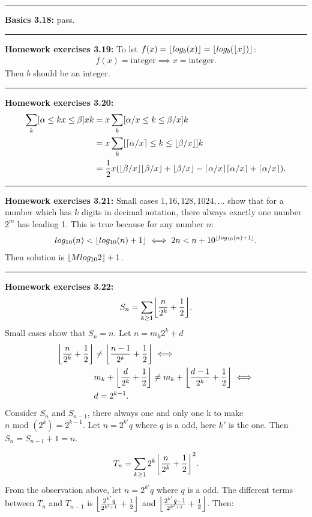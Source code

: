 \documentclass{article}
\DeclarePairedDelimiter\ceil{\lceil}{\rceil}
\DeclarePairedDelimiter\floor{\lfloor}{\rfloor}
\begin{document}
\noindent\rule{\textwidth}{0.4pt}
\textbf{Basics 3.18:}
pass.

\noindent\rule{\textwidth}{0.4pt}
\textbf{Homework exercises 3.19:}
To let $f(x) = \floor{log_b (x)} = \floor{log_b (\floor{x})}$:
\begin{align}
f(x) = \text{integer} \implies x = \text{integer}.
\end{align}
Then $b$ should be an integer.

\noindent\rule{\textwidth}{0.4pt}
\textbf{Homework exercises 3.20:}
\begin{align}
\sum_k [\alpha \le kx \le \beta] xk &= x\sum_k [\alpha/x \le k \le \beta/x] k \\
				    &= x\sum_k [\ceil{\alpha/x} \le k \le \floor{\beta/x}] k \\
				    &= \frac{1}{2}x(\floor{\beta/x}\floor{\beta/x} + \floor{\beta/x} - \ceil{\alpha/x}\ceil{\alpha/x} + \ceil{\alpha/x}).
\end{align}

\noindent\rule{\textwidth}{0.4pt}
\textbf{Homework exercises 3.21:}
Small cases $1, 16, 128, 1024, ...$ show that for a number which has $k$ digits in decimal notation, there always exactly one number $2^m$ has leading 1.
This is true because for any number $n$:
\begin{align}
log_{10} (n) < \floor{log_{10}(n)+1} \iff 2n < n + 10^{\floor{log_{10}(n)+1}}.
\end{align}
Then solution is $\floor{M log_{10}2} + 1$.

\noindent\rule{\textwidth}{0.4pt}
\textbf{Homework exercises 3.22:}
\begin{align}
S_n = \sum_{k \ge 1} \floor*{\frac{n}{2^k} + \frac{1}{2}}.
\end{align}
Small cases show that $S_n = n$.
Let $n = m_k 2^k + d$
\begin{align}
\floor*{\frac{n}{2^k} + \frac{1}{2}} &\neq \floor*{\frac{n-1}{2^k} + \frac{1}{2}} \iff \\
				     &m_k + \floor*{\frac{d}{2^k} + \frac{1}{2}} \neq m_k + \floor*{\frac{d-1}{2^k} + \frac{1}{2}} \iff \\
				     &d = 2^{k-1}.
\end{align}
Consider $S_n$ and $S_{n-1}$, there always one and only one k to make $n \text{ mod } (2^k) = 2^{k-1}$.
Let $n = 2^{k'} q$ where $q$ is a odd, here $k'$ is the one.
Then $S_n = S_{n-1} + 1 = n$.

\begin{align}
T_n = \sum_{k \ge 1} 2^k \floor*{\frac{n}{2^k} + \frac{1}{2}}^2.
\end{align}
From the observation above, let $n = 2^{k'} q$ where $q$ is a odd.
The different terms between $T_n$ and $T_{n-1}$ is $\floor*{\frac{2^{k'} q}{2^{k'+1}} + \frac{1}{2}}$ and $\floor*{\frac{2^{k'} q-1}{2^{k'+1}} + \frac{1}{2}}$.
Then:
\end{document}
